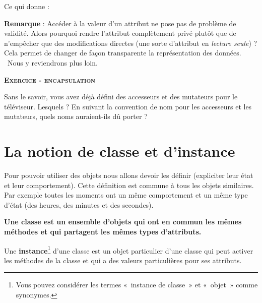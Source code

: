 
\bigskip

Ce qui donne :


\textbf{Remarque} : Accéder à la valeur d’un attribut ne pose pas de
problème de validité. Alors pourquoi rendre l’attribut complètement
privé plutôt que de n’empêcher que des modifications directes (une
sorte d’attribut en \textit{lecture seule}) ? Cela permet de changer de
façon transparente la représentation des données. \ Nous y reviendrons
plus loin.

{\sffamily\bfseries\scshape
Exercice - encapsulation}

Sans le savoir, vous avez déjà défini des accesseurs et des 
mutateurs pour le téléviseur. Lesquels ? En suivant la convention
de nom pour les accesseurs et les mutateurs, 
quels noms auraient-ils dû porter ?


\section{La notion de classe et d'instance}

Pour pouvoir utiliser des objets nous allons devoir les définir
(expliciter leur état et leur comportement). Cette définition est
commune à tous les objets similaires. Par exemple toutes les moments ont
un même comportement et un même type d'état (des heures, des minutes et
des secondes).

{\sffamily\bfseries\upshape
{
Une \textbf{classe} est un ensemble d'objets qui ont en
commun les mêmes méthodes et qui partagent les mêmes types
d'attributs.}}

Une \textbf{instance}\footnote{Vous pouvez considérer les termes
«~instance de classe~» et «~objet~» comme synonymes. }
d'une classe est un objet particulier
d'une classe qui peut activer les méthodes de la
classe et qui a des valeurs particulières pour ses attributs.

